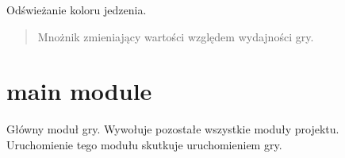 \documentclass[letterpaper,10pt,polish]{sphinxmanual}
\begin{document}
\begin{fulllineitems}
\begin{fulllineitems}
\begin{quote}
\begin{description}
\end{description}\end{quote}

\end{fulllineitems}


\begin{fulllineitems}
\label{\detokenize{food:food.Food.update}}
\pysigstartsignatures
{}
\pysigstopsignatures
\sphinxAtStartPar
Odświeżanie koloru jedzenia.
\begin{quote}\begin{description}
\sphinxAtStartPar
{} \textendash{} Mnożnik zmieniający wartości względem wydajności gry.

\end{description}\end{quote}

\end{fulllineitems}


\end{fulllineitems}


\sphinxstepscope


\section{main module}
\label{\detokenize{main:module-main}}\label{\detokenize{main:main-module}}\label{\detokenize{main::doc}}
\sphinxAtStartPar
Główny moduł gry. Wywołuje pozostałe wszystkie moduły projektu. Uruchomienie
tego modułu skutkuje uruchomieniem gry.
\end{document}
